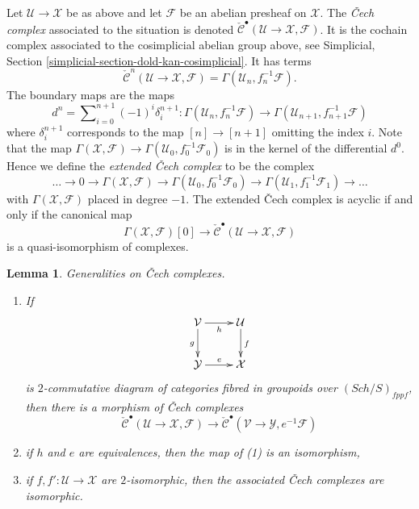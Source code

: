 \documentclass{stacks-project}
\theoremstyle{plain}
\newtheorem{lemma}[subsection]{Lemma}
\theoremstyle{definition}
\theoremstyle{remark}
\numberwithin{equation}{subsection}
\def\Sch{\mathit{Sch}}
\begin{document}
\medskip\noindent
Let $\mathcal{U} \to \mathcal{X}$ be as above and let $\mathcal{F}$
be an abelian presheaf on $\mathcal{X}$.
The {\it {\v C}ech complex} associated to the situation is denoted
$\check{\mathcal{C}}^\bullet(\mathcal{U} \to \mathcal{X}, \mathcal{F})$.
It is the cochain complex associated to the cosimplicial abelian group
above, see
Simplicial, Section \ref{simplicial-section-dold-kan-cosimplicial}.
It has terms
$$
\check{\mathcal{C}}^n(\mathcal{U} \to \mathcal{X}, \mathcal{F})
= \Gamma(\mathcal{U}_n, f_n^{-1}\mathcal{F}).
$$
The boundary maps are the maps
$$
d^n = \sum\nolimits_{i = 0}^{n + 1} (-1)^i \delta^{n + 1}_i :
\Gamma(\mathcal{U}_n, f_n^{-1}\mathcal{F})
\longrightarrow
\Gamma(\mathcal{U}_{n + 1}, f_{n + 1}^{-1}\mathcal{F})
$$
where $\delta^{n + 1}_i$ corresponds to the map
$[n] \to [n + 1]$ omitting the index $i$. Note that the map
$\Gamma(\mathcal{X}, \mathcal{F}) \to
\Gamma(\mathcal{U}_0, f_0^{-1}\mathcal{F}_0)$
is in the kernel of the differential $d^0$. Hence we define
the {\it extended {\v C}ech complex} to be the complex
$$
\ldots \to 0 \to
\Gamma(\mathcal{X}, \mathcal{F}) \to
\Gamma(\mathcal{U}_0, f_0^{-1}\mathcal{F}_0) \to
\Gamma(\mathcal{U}_1, f_1^{-1}\mathcal{F}_1) \to \ldots
$$
with $\Gamma(\mathcal{X}, \mathcal{F})$ placed in degree $-1$.
The extended {\v C}ech complex is acyclic if and only if the canonical map
$$
\Gamma(\mathcal{X}, \mathcal{F})[0]
\longrightarrow
\check{\mathcal{C}}^\bullet(\mathcal{U} \to \mathcal{X}, \mathcal{F})
$$
is a quasi-isomorphism of complexes.

\begin{lemma}
\label{lemma-generalities}
Generalities on {\v C}ech complexes.
\begin{enumerate}
\item If
$$
\xymatrix{
\mathcal{V} \ar[d]_g \ar[r]_h & \mathcal{U} \ar[d]^f \\
\mathcal{Y} \ar[r]^e & \mathcal{X}
}
$$
is $2$-commutative diagram of categories fibred in groupoids over
$(\Sch/S)_{fppf}$, then there is a morphism of {\v C}ech complexes
$$
\check{\mathcal{C}}^\bullet(\mathcal{U} \to \mathcal{X}, \mathcal{F})
\longrightarrow
\check{\mathcal{C}}^\bullet(\mathcal{V} \to \mathcal{Y}, e^{-1}\mathcal{F})
$$
\item if $h$ and $e$ are equivalences, then the map of (1) is an isomorphism,
\item if $f, f' : \mathcal{U} \to \mathcal{X}$ are $2$-isomorphic, then
the associated {\v C}ech complexes are isomorphic.
\end{enumerate}
\end{lemma}
\end{document}
